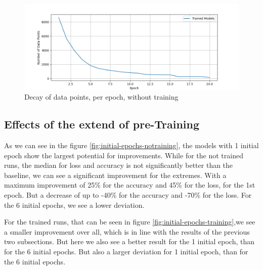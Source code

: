 \begin{figure}
    \centering
    \includegraphics[width=\textwidth]{plots/NotTrained_Points_perEpoch.png}
    \caption{Decay of data points, per epoch, without training}
    \label{fig:decay_Notraining}
\end{figure}
\subsection{Effects of the extend of pre-Training}\label{subsec:effects-of-the-extend-of-pre-training}
As we can see in the figure \ref{fig:initial-epochs-notraining}, the models with 1 initial epoch show the largest potential for improvements.
While for the not trained runs, the median for loss and accuracy is not significantly better than the baseline, we can see a significant improvement for the extremes.
With a maximum improvement of 25\% for the accuracy and 45\% for the loss, for the 1st epoch.
But a decrease of up to -40\% for the accuracy and -70\% for the loss.
For the 6 initial epochs, we see a lower deviation.

For the trained runs, that can be seen in figure \ref{fig:initial-epochs-training},we see a smaller improvement over all, which is in line with the results of the previous two subsections.
But here we also see a better result for the 1 initial epoch, than for the 6 initial epochs.
But also a larger deviation for 1 initial epoch, than for the 6 initial epochs.

